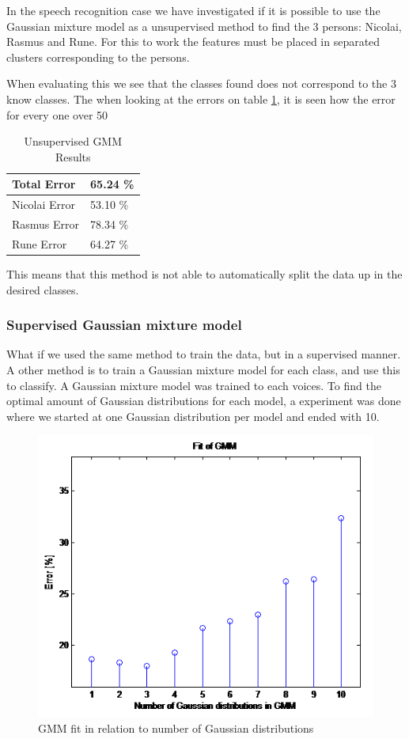 In the speech recognition case we have investigated if it is possible to use the Gaussian mixture model as a unsupervised method to find the 3 persons: Nicolai, Rasmus and Rune. For this to work the features must be placed in separated clusters corresponding to the persons. 

When evaluating this we see that the classes found does not correspond to the 3 know classes. The when looking at the errors on table \ref{tab:resultTableUGMM}, it is seen how the error for every one over 50%


\begin{table}[H]
\centering
\begin{tabular}{ll}
\hline
Total Error   & 65.24 \% \\ \hline
Nicolai Error & 53.10 \% \\
Rasmus Error  & 78.34 \% \\
Rune Error    & 64.27 \% \\ \hline
\end{tabular}
\caption{Unsupervised GMM Results}
\label{tab:resultTableUGMM}
\end{table}
 
This means that this method is not able to automatically split the data up in the desired classes.
 
\subsubsection{Supervised Gaussian mixture model}
\label{sec:EMGMM}

What if we used the same method to train the data, but in a supervised manner. A other method is to train a Gaussian mixture model for each class, and use this to classify. A Gaussian mixture model was trained to each voices. To find the optimal amount of Gaussian distributions for each model, a experiment was done where we started at one Gaussian distribution per model and ended with 10.

\begin{figure}[H]
\centering
\includegraphics[scale=0.7]{billeder/fitGmm}
\caption{GMM fit in relation to number of Gaussian distributions}
\label{fig:fitGMM}
\end{figure}

